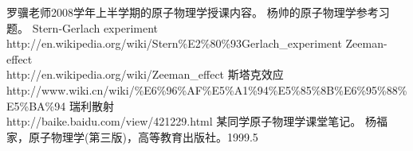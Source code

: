 \newpage
\begin{thebibliography}{10}
 罗骥老师2008学年上半学期的原子物理学授课内容。
 杨帅的原子物理学参考习题。
 Stern-Gerlach experiment\\http://en.wikipedia.org/wiki/Stern\%E2\%80\%93Gerlach\_experiment
 Zeeman-effect \\http://en.wikipedia.org/wiki/Zeeman\_effect
 斯塔克效应 \\http://www.wiki.cn/wiki/\%E6\%96\%AF\%E5\%A1\%94\%E5\%85\%8B\%E6\%95\%88\%E5\%BA\%94
 瑞利散射 \\http://baike.baidu.com/view/421229.html
 某同学原子物理学课堂笔记。
 杨福家，原子物理学(第三版)，高等教育出版社。1999.5
\end{thebibliography}
